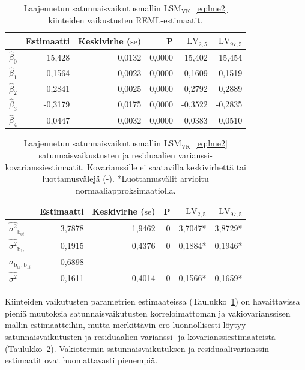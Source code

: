 \documentclass[finnish]{docopts}
\begin{document}
\begin{table}[H]
\centering
\begin{tabular}{lrrrrr}
\toprule
  & Estimaatti & Keskivirhe ($\text{se}$) & P & $\text{LV}_{2,5}$ & $\text{LV}_{97,5}$\\
\midrule
$\hat{\beta}_0$ & 15,428 & 0,0132 & 0,0000 & 15,402 & 15,454\\
$\hat{\beta}_1$ & -0,1564 & 0,0023 & 0,0000 & -0,1609 & -0,1519\\
$\hat{\beta}_2$ & 0,2841 & 0,0025 & 0,0000 & 0,2792 & 0,2889\\
$\hat{\beta}_3$ & -0,3179 & 0,0175 & 0,0000 & -0,3522 & -0,2835\\
$\hat{\beta}_4$ & 0,0447 & 0,0032 & 0,0000 & 0,0383 & 0,0510\\
\bottomrule
\end{tabular}
\caption{Laajennetun satunnaisvaikutusmallin $\text{LSM}_{\text{VK}}$~\ref{eq:lme2} kiinteiden vaikustusten REML-estimaatit.}
\label{table:lme2vk}
\end{table}

\begin{table}[H]
\centering
\begin{tabular}{lrrrrr}
\toprule
  & Estimaatti & Keskivirhe ($\text{se}$) & P & $\text{LV}_{2,5}$ & $\text{LV}_{97,5}$\\
\midrule
$\hat{\sigma^2}_{\text{b}_{0i}}$ & 3,7878 & 1,9462 & 0 & 3,7047* & 3,8729* \\
$\hat{\sigma^2}_{\text{b}_{1i}}$ & 0,1915 & 0,4376 & 0 & 0,1884* & 0,1946* \\
$\hat{\sigma}_{\text{b}_{0i}, \text{b}_{1i}}$ & -0,6898 & - & - & - & - \\
\addlinespace
$\hat{\sigma^2}$ & 0,1611 & 0,4014 & 0 & 0,1566* & 0,1659* \\
\bottomrule
\end{tabular}
\caption{Laajennetun satunnaisvaikutusmallin $\text{LSM}_{\text{VK}}$~\ref{eq:lme2} satunnaisvaikustusten ja residuaalien varianssi-kovarianssiestimaatit. Kovarianssille ei saatavilla keskivirhettä tai luottamusvälejä (-). *Luottamusvälit arvioitu normaaliapproksimaatiolla.}
\label{table:lme3vk}
\end{table}

Kiinteiden vaikutusten parametrien estimaateissa (Taulukko~\ref{table:lme2vk}) on havaittavissa pieniä muutoksia satunnaisvaikutusten korreloimattoman ja vakiovarianssisen mallin estimaatteihin, mutta merkittävin ero luonnollisesti löytyy satunnaisvaikutusten ja residuaalien varianssi- ja kovarianssiestimaateista (Taulukko~\ref{table:lme3vk}). Vakiotermin satunnaisvaikutuksen ja residuaalivarianssin estimaatit ovat huomattavasti pienempiä.\\
\end{document}
